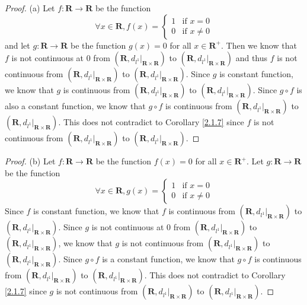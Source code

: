 \begin{proof}{(a)}
    Let \(f : \mathbf{R} \to \mathbf{R}\) be the function
    \[
        \forall x \in \mathbf{R}, f(x) = \begin{cases}
            1 & \text{if } x = 0    \\
            0 & \text{if } x \neq 0
        \end{cases}
    \]
    and let \(g : \mathbf{R} \to \mathbf{R}\) be the function \(g(x) = 0\) for all \(x \in \mathbf{R}^+\).
    Then we know that \(f\) is not continuous at \(0\) from \((\mathbf{R}, d_{l^1}|_{\mathbf{R} \times \mathbf{R}})\) to \((\mathbf{R}, d_{l^1}|_{\mathbf{R} \times \mathbf{R}})\) and thus \(f\) is not continuous from \((\mathbf{R}, d_{l^1}|_{\mathbf{R} \times \mathbf{R}})\) to \((\mathbf{R}, d_{l^1}|_{\mathbf{R} \times \mathbf{R}})\).
    Since \(g\) is constant function, we know that \(g\) is continuous from \((\mathbf{R}, d_{l^1}|_{\mathbf{R} \times \mathbf{R}})\) to \((\mathbf{R}, d_{l^1}|_{\mathbf{R} \times \mathbf{R}})\).
    Since \(g \circ f\) is also a constant function, we know that \(g \circ f\) is continuous from \((\mathbf{R}, d_{l^1}|_{\mathbf{R} \times \mathbf{R}})\) to \((\mathbf{R}, d_{l^1}|_{\mathbf{R} \times \mathbf{R}})\).
    This does not contradict to Corollary \ref{2.1.7} since \(f\) is not continuous from \((\mathbf{R}, d_{l^1}|_{\mathbf{R} \times \mathbf{R}})\) to \((\mathbf{R}, d_{l^1}|_{\mathbf{R} \times \mathbf{R}})\).
\end{proof}

\begin{proof}{(b)}
    Let \(f : \mathbf{R} \to \mathbf{R}\) be the function \(f(x) = 0\) for all \(x \in \mathbf{R}^+\).
    Let \(g : \mathbf{R} \to \mathbf{R}\) be the function
    \[
        \forall x \in \mathbf{R}, g(x) = \begin{cases}
            1 & \text{if } x = 0    \\
            0 & \text{if } x \neq 0
        \end{cases}
    \]
    Since \(f\) is constant function, we know that \(f\) is continuous from \((\mathbf{R}, d_{l^1}|_{\mathbf{R} \times \mathbf{R}})\) to \((\mathbf{R}, d_{l^1}|_{\mathbf{R} \times \mathbf{R}})\).
    Since \(g\) is not continuous at \(0\) from \((\mathbf{R}, d_{l^1}|_{\mathbf{R} \times \mathbf{R}})\) to \((\mathbf{R}, d_{l^1}|_{\mathbf{R} \times \mathbf{R}})\), we know that \(g\) is not continuous from \((\mathbf{R}, d_{l^1}|_{\mathbf{R} \times \mathbf{R}})\) to \((\mathbf{R}, d_{l^1}|_{\mathbf{R} \times \mathbf{R}})\).
    Since \(g \circ f\) is a constant function, we know that \(g \circ f\) is continuous from \((\mathbf{R}, d_{l^1}|_{\mathbf{R} \times \mathbf{R}})\) to \((\mathbf{R}, d_{l^1}|_{\mathbf{R} \times \mathbf{R}})\).
    This does not contradict to Corollary \ref{2.1.7} since \(g\) is not continuous from \((\mathbf{R}, d_{l^1}|_{\mathbf{R} \times \mathbf{R}})\) to \((\mathbf{R}, d_{l^1}|_{\mathbf{R} \times \mathbf{R}})\).
\end{proof}


